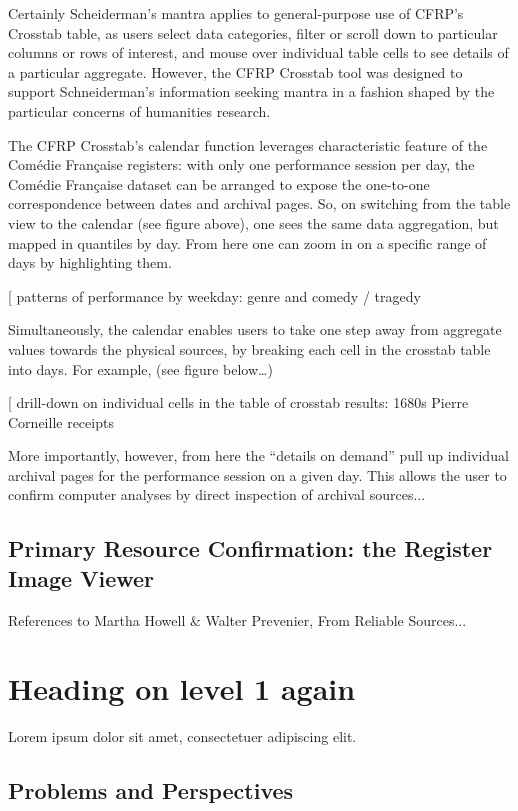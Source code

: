 \documentclass[	DIV=calc,%
							paper=a4,%
							fontsize=11pt,%
							twocolumn]{scrartcl}	 					%
\begin{document}
Certainly Scheiderman’s mantra applies to general-purpose use of CFRP’s Crosstab table, as users select data categories, filter or scroll down to particular columns or rows of interest, and mouse over individual table cells to see details of a particular aggregate.  However, the CFRP Crosstab tool was designed to support Schneiderman’s information seeking mantra in a fashion shaped by the particular concerns of humanities research.

The CFRP Crosstab’s calendar function leverages characteristic feature of the Comédie Française registers: with only one performance session per day, the Comédie Française dataset can be arranged to expose the one-to-one correspondence between dates and archival pages.  So, on switching from the table view to the calendar (see figure above), one sees the same data aggregation, but mapped in quantiles by day.  From here one can zoom in on a specific range of days by highlighting them.

[ patterns of performance by weekday: genre and comedy / tragedy

Simultaneously, the calendar enables users to take one step away from aggregate values towards the physical sources, by breaking each cell in the crosstab table into days.  For example, (see figure below…)

[ drill-down on individual cells in the table of crosstab results: 1680s Pierre Corneille receipts

More importantly, however, from here the ``details on demand'' pull up individual archival pages for the performance session on a given day.  This allows the user to confirm computer analyses by direct inspection of archival sources...

\subsection*{Primary Resource Confirmation: the Register Image Viewer}

References to Martha Howell \& Walter Prevenier, From Reliable Sources...

\section*{Heading on level 1 again}
Lorem ipsum dolor sit amet, consectetuer adipiscing elit.

\subsection*{Problems and Perspectives}
\end{document}
